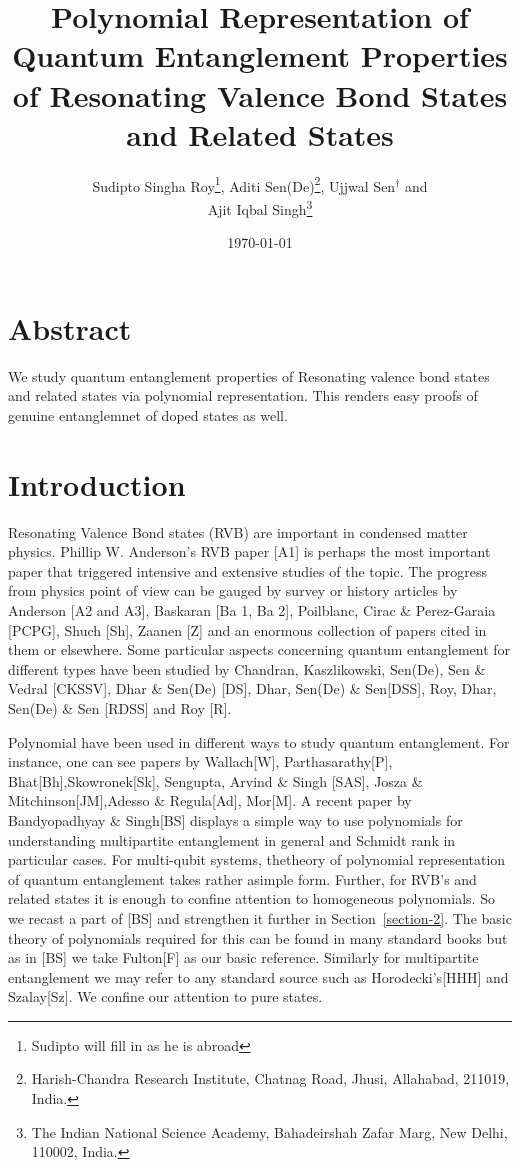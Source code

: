 \documentclass[a4paper,12pt]{article}
\theoremstyle{definition}
\theoremstyle{underlinethm}
\theoremstyle{definition}
\begin{document}
\title{Polynomial Representation of Quantum Entanglement Properties of Resonating Valence Bond States and Related States}
\author{Sudipto Singha Roy\footnote{Sudipto will fill in as he is abroad}, Aditi Sen(De){\footnote{Harish-Chandra Research Institute, Chatnag Road, Jhusi, Allahabad, 211019, India.}}, Ujjwal Sen{$^\dagger$} and\\ Ajit Iqbal Singh{\footnote{The Indian National Science Academy, Bahadeirshah Zafar Marg, New Delhi, 110002, India.}}}

\date{\today}

\maketitle

\section*{Abstract}

We study quantum entanglement properties of Resonating valence bond states and related states via polynomial representation. This renders easy proofs of genuine entanglemnet of doped states as well.


\section{Introduction}\label{section-1}

Resonating Valence Bond states (RVB) are important in condensed matter physics. Phillip W. Anderson's RVB paper [A1] is perhaps the most important paper that triggered intensive and extensive studies of the topic. The progress from physics point of view can be gauged by survey or history articles by Anderson [A2 and A3], Baskaran [Ba 1, Ba 2], Poilblanc, Cirac \& Perez-Garaia [PCPG], Shuch [Sh], Zaanen [Z] and an enormous collection of papers cited in them or elsewhere. Some particular aspects concerning quantum entanglement for different types have been studied by Chandran, Kaszlikowski, Sen(De), Sen \& Vedral [CKSSV], Dhar \& Sen(De) [DS], Dhar, Sen(De) \& Sen[DSS], Roy, Dhar, Sen(De) \& Sen [RDSS] and Roy [R].


Polynomial have been used in different ways to study quantum entanglement. For instance, one can see papers by Wallach[W], Parthasarathy[P], Bhat[Bh],\break Skowronek[Sk], Sengupta, Arvind \& Singh [SAS], Josza \& Mitchinson[JM],\break Adesso \& Regula[Ad], Mor[M]. A recent paper by Bandyopadhyay \& Singh[BS] displays a simple way to use polynomials for understanding multipartite entanglement in general and Schmidt rank in particular cases. For multi-qubit systems, the\break theory of polynomial representation of quantum entanglement takes rather a\break simple form. Further, for RVB's and related states it is enough to confine attention to homogeneous polynomials. So we recast a part of [BS] and strengthen it further in Section~\ref{section-2}. The basic theory of polynomials required for this can be found in many standard books but as in [BS] we take Fulton[F] as our basic reference. Similarly for multipartite  entanglement we may refer to any standard source such as Horodecki's[HHH] and Szalay[Sz]. We confine our attention to pure states.
\end{document}
